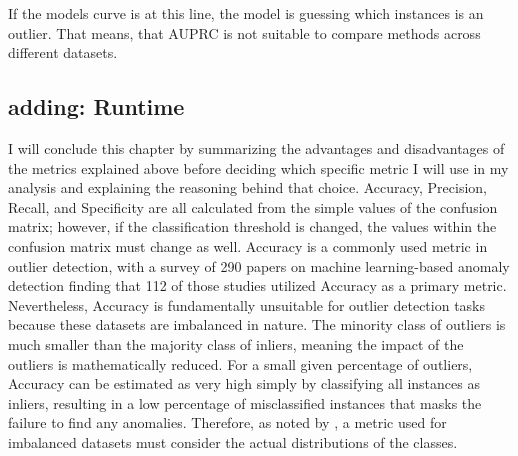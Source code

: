 If the models curve is at this line, the model is guessing which instances is an outlier.
That means, that AUPRC is not suitable to compare methods across different datasets. 


\subsection*{adding: Runtime}


I will conclude this chapter by summarizing the advantages and disadvantages of the metrics explained above before deciding which specific metric I will use in my analysis and explaining the reasoning behind that choice.
Accuracy, Precision, Recall, and Specificity are all calculated from the simple values of the confusion matrix; however, if the classification threshold is changed, the values within the confusion matrix must change as well.
Accuracy is a commonly used metric in outlier detection, with a survey of 290 papers on machine learning-based anomaly detection finding that 112 of those studies utilized Accuracy as a primary metric. \citep[p.78664]{nassif2021}
Nevertheless, Accuracy is fundamentally unsuitable for outlier detection tasks because these datasets are imbalanced in nature. 
The minority class of outliers is much smaller than the majority class of inliers, meaning the impact of the outliers is mathematically reduced. 
For a small given percentage of outliers, Accuracy can be estimated as very high simply by classifying all instances as inliers, resulting in a low percentage of misclassified instances that masks the failure to find any anomalies. 
Therefore, as noted by \citet[p.8]{branco2016survey}, a metric used for imbalanced datasets must consider the actual distributions of the classes.


